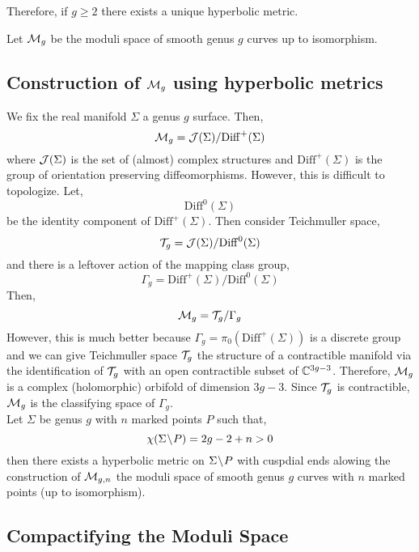 \documentclass[12pt]{article}
\begin{document}
\begin{rmk}
Therefore, if $g \ge 2$ there exists a unique hyperbolic metric. 
\end{rmk}

\begin{defn}
Let $\mathcal{M}_g$ be the moduli space of smooth genus $g$ curves up to isomorphism. 
\end{defn}

\subsection{Construction of $\mathcal{M}_g$ using hyperbolic metrics}

We fix the real manifold $\Sigma$ a genus $g$ surface. Then,
\[ \mathcal{M}_g = \mathcal{J}(\Sigma) / \mathrm{Diff}^+(\Sigma) \]
where $\mathcal{J}(\Sigma)$ is the set of (almost) complex structures and $\mathrm{Diff}^+(\Sigma)$ is the group of orientation preserving diffeomorphisms. However, this is difficult to topologize. Let,
\[ \mathrm{Diff}^0(\Sigma) \]
be the identity component of $\mathrm{Diff}^+(\Sigma)$. Then consider Teichmuller space,
\[ \mathcal{T}_g = \mathcal{J}(\Sigma) / \mathrm{Diff}^0(\Sigma) \]
and there is a leftover action of the mapping class group,
\[ \Gamma_g = \mathrm{Diff}^+(\Sigma) / \mathrm{Diff}^0(\Sigma) \]
Then,
\[ \mathcal{M}_g = \mathcal{T}_g / \Gamma_g \]
However, this is much better because $\Gamma_g = \pi_0(\mathrm{Diff}^+(\Sigma))$ is a discrete group and we can give Teichmuller space $\mathcal{T}_g$ the structure of a contractible manifold via the identification of $\mathcal{T}_g$ with an open contractible subset of $\mathbb{C}^{3g - 3}$. Therefore, $\mathcal{M}_g$ is a complex (holomorphic) orbifold of dimension $3g - 3$. Since $\mathcal{T}_g$ is contractible, $\mathcal{M}_g$ is the classifying space of $\Gamma_g$.
\bigskip\\
Let $\Sigma$ be genus $g$ with $n$ marked points $P$ such that,
\[ \chi(\Sigma \! \setminus \! P) = 2 g - 2 + n > 0 \]
then there exists a hyperbolic metric on $\Sigma \! \setminus \! P$ with cuspdial ends alowing the construction of $\mathcal{M}_{g,n}$ the moduli space of smooth genus $g$ curves with $n$ marked points (up to isomorphism). 

\subsection{Compactifying the Moduli Space}

\newcommand{\Mbar}{\overline{\mathcal{M}}}
\end{document}
